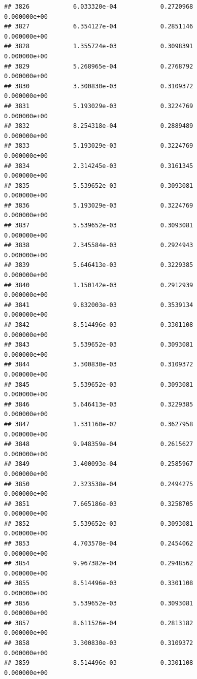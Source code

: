 \documentclass[
]{article}
\begin{document}
\begin{verbatim}
## 3826            6.033320e-04            0.2720968            0.000000e+00
## 3827            6.354127e-04            0.2851146            0.000000e+00
## 3828            1.355724e-03            0.3098391            0.000000e+00
## 3829            5.268965e-04            0.2768792            0.000000e+00
## 3830            3.300830e-03            0.3109372            0.000000e+00
## 3831            5.193029e-03            0.3224769            0.000000e+00
## 3832            8.254318e-04            0.2889489            0.000000e+00
## 3833            5.193029e-03            0.3224769            0.000000e+00
## 3834            2.314245e-03            0.3161345            0.000000e+00
## 3835            5.539652e-03            0.3093081            0.000000e+00
## 3836            5.193029e-03            0.3224769            0.000000e+00
## 3837            5.539652e-03            0.3093081            0.000000e+00
## 3838            2.345584e-03            0.2924943            0.000000e+00
## 3839            5.646413e-03            0.3229385            0.000000e+00
## 3840            1.150142e-03            0.2912939            0.000000e+00
## 3841            9.832003e-03            0.3539134            0.000000e+00
## 3842            8.514496e-03            0.3301108            0.000000e+00
## 3843            5.539652e-03            0.3093081            0.000000e+00
## 3844            3.300830e-03            0.3109372            0.000000e+00
## 3845            5.539652e-03            0.3093081            0.000000e+00
## 3846            5.646413e-03            0.3229385            0.000000e+00
## 3847            1.331160e-02            0.3627958            0.000000e+00
## 3848            9.948359e-04            0.2615627            0.000000e+00
## 3849            3.400093e-04            0.2585967            0.000000e+00
## 3850            2.323538e-04            0.2494275            0.000000e+00
## 3851            7.665186e-03            0.3258705            0.000000e+00
## 3852            5.539652e-03            0.3093081            0.000000e+00
## 3853            4.703578e-04            0.2454062            0.000000e+00
## 3854            9.967382e-04            0.2948562            0.000000e+00
## 3855            8.514496e-03            0.3301108            0.000000e+00
## 3856            5.539652e-03            0.3093081            0.000000e+00
## 3857            8.611526e-04            0.2813182            0.000000e+00
## 3858            3.300830e-03            0.3109372            0.000000e+00
## 3859            8.514496e-03            0.3301108            0.000000e+00

\end{verbatim}
\end{document}
